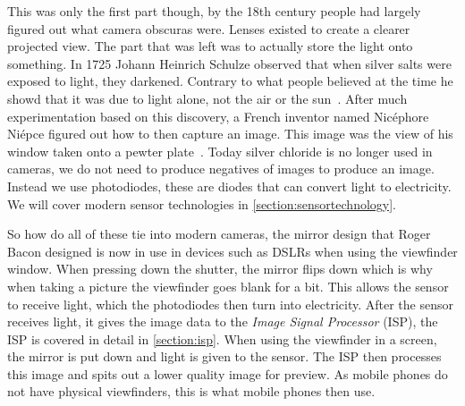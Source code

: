 This was only the first part though, by the 18th century people had largely
figured out what camera obscuras were. Lenses existed to create a clearer
projected view. The part that was left was to actually store the light onto
something. In 1725 Johann Heinrich Schulze observed that when silver salts
were exposed to light, they darkened. Contrary to what people believed at the
time he showd that it was due to light alone, not the air or the
sun~\cite{gernsheim1986concise}. After much experimentation based on this
discovery, a French inventor named Nic\'ephore Ni\'epce figured out how to
then capture an image. This image was the view of his window taken onto a
pewter plate~\cite{gernsheim1986concise}. Today silver chloride is no longer
used in cameras, we do not need to produce negatives of images to produce an
image. Instead we use photodiodes, these are diodes that can convert light to
electricity. We will cover modern sensor technologies in \cref{section:sensortechnology}.

So how do all of these tie into modern cameras, the mirror design that Roger
Bacon designed is now in use in devices such as DSLRs when using the viewfinder
window. When pressing down the shutter, the mirror flips down which is why when
taking a picture the viewfinder goes blank for a bit. This allows the sensor to
receive light, which the photodiodes then turn into electricity. After the
sensor receives light, it gives the image data to the \textit{Image Signal
Processor} (ISP), the ISP is covered in detail in \cref{section:isp}. When
using the viewfinder in a screen, the mirror is put down and light is given to
the sensor. The ISP then processes this image and spits out a lower quality
image for preview. As mobile phones do not have physical viewfinders, this is
what mobile phones then use.

